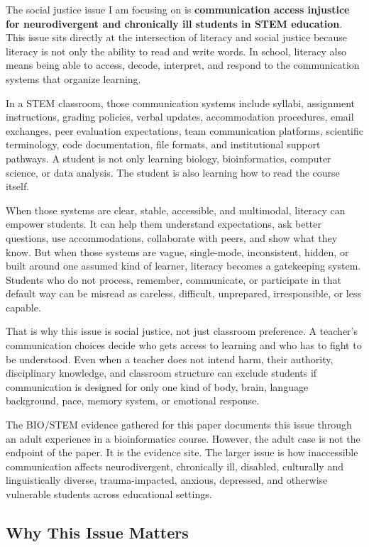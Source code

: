 \documentclass[12pt]{article}
\begin{document}
The social justice issue I am focusing on is \textbf{communication access injustice for neurodivergent and chronically ill students in STEM education}. This issue sits directly at the intersection of literacy and social justice because literacy is not only the ability to read and write words. In school, literacy also means being able to access, decode, interpret, and respond to the communication systems that organize learning.

In a STEM classroom, those communication systems include syllabi, assignment instructions, grading policies, verbal updates, accommodation procedures, email exchanges, peer evaluation expectations, team communication platforms, scientific terminology, code documentation, file formats, and institutional support pathways. A student is not only learning biology, bioinformatics, computer science, or data analysis. The student is also learning how to read the course itself.

When those systems are clear, stable, accessible, and multimodal, literacy can empower students. It can help them understand expectations, ask better questions, use accommodations, collaborate with peers, and show what they know. But when those systems are vague, single-mode, inconsistent, hidden, or built around one assumed kind of learner, literacy becomes a gatekeeping system. Students who do not process, remember, communicate, or participate in that default way can be misread as careless, difficult, unprepared, irresponsible, or less capable.

That is why this issue is social justice, not just classroom preference. A teacher's communication choices decide who gets access to learning and who has to fight to be understood. Even when a teacher does not intend harm, their authority, disciplinary knowledge, and classroom structure can exclude students if communication is designed for only one kind of body, brain, language background, pace, memory system, or emotional response.

The BIO/STEM evidence gathered for this paper documents this issue through an adult experience in a bioinformatics course. However, the adult case is not the endpoint of the paper. It is the evidence site. The larger issue is how inaccessible communication affects neurodivergent, chronically ill, disabled, culturally and linguistically diverse, trauma-impacted, anxious, depressed, and otherwise vulnerable students across educational settings.

\subsection*{Why This Issue Matters}
\end{document}
